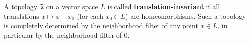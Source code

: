 A topology $\mathfrak{T}$ on a vector space $L$ is called \textbf{translation-invariant} if all translations $x \mapsto x + x_0$ (for each $x_0 \in L$) are homeomorphisms. Such a topology is completely determined by the neighborhood filter of any point $x \in L$, in particular by the neighborhood filter of $0$.
